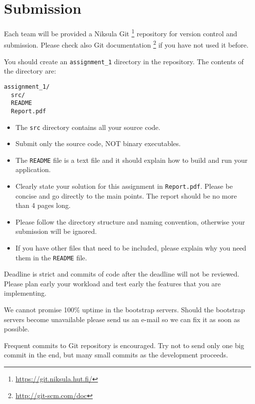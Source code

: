 \documentclass[12pt, a4paper]{article}
\begin{document}
\section{Submission}
Each team will be provided a Niksula Git \footnote{\url{https://git.niksula.hut.fi/}} repository for version control and submission.
Please check also Git documentation \footnote{\url{http://git-scm.com/doc}} if you have not used it before.

You should create an \texttt{assignment\_1} directory in the repository.
The contents of the directory are:
\begin{verbatim}
assignment_1/
  src/
  README
  Report.pdf
\end{verbatim}

\begin{itemize}
\item The \texttt{src} directory contains all your source code.
\item Submit only the source code, NOT binary executables.
\item The \texttt{README} file is a text file and it should explain how to build and run your application.
\item Clearly state your solution for this assignment in \texttt{Report.pdf}. Please be concise and go directly to the main points. The report should be no more than 4 pages long.
\item Please follow the directory structure and naming convention, otherwise your submission will be ignored.
\item If you have other files that need to be included, please explain why you need them in the \texttt{README} file.
\end{itemize}

Deadline is strict and commits of code after the deadline will not be reviewed.
Please plan early your workload and test early the features that you are implementing.

We cannot promise 100\% uptime in the bootstrap servers.
Should the bootstrap servers become unavailable please send us an e-mail so we can fix it as soon as possible.

Frequent commits to Git repository is encouraged.
Try not to send only one big commit in the end, but many small commits as the development proceeds.
\end{document}
